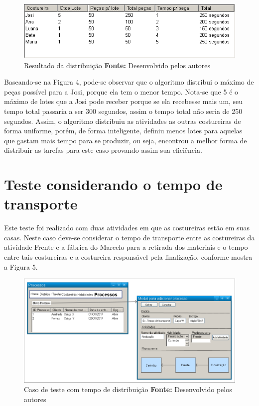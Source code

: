 \begin{figure}[h!]
	\centerline{\includegraphics[scale=0.6]{./imagens/test_case1_resultado.png}}
	\caption[Caso de teste Habilidade]
	{Resultado da distribuição \textbf{Fonte:} Desenvolvido pelos autores}
	\label{fig:exemplo1}
\end{figure}

\par Baseando-se na Figura 4, pode-se observar que o algoritmo distribui o
máximo de peças possível para a Josi, porque ela tem o menor tempo. Nota-se que 5 é o máximo de lotes que a Josi pode receber porque se ela recebesse mais um, seu 
tempo total passaria a ser 300 segundos, assim o tempo total não seria de 250
segundos. Assim, o algoritmo distribuiu as atividades as outras costureiras de forma uniforme, porém, de forma inteligente, definiu menos lotes para aquelas que 
gastam mais tempo para se produzir, ou seja, encontrou a melhor forma de distribuir as tarefas para este caso provando assim
sua eficiência.

\section{Teste considerando o tempo de transporte}
\par Este teste foi realizado com duas atividades em que as costureiras estão em suas casas. Neste caso deve-se considerar
o tempo de transporte entre as costureiras da atividade Frente e a fábrica do Marcelo para a retirada dos materiais e o tempo 
entre tais costureiras e a costureira responsável pela finalização, conforme
mostra a Figura 5.


\begin{figure}[h!]
	\centerline{\includegraphics[scale=0.3]{./imagens/test_case_2.png}}
	\caption[Caso de teste tempo]
	{Caso de teste com tempo de distribuição \textbf{Fonte:} Desenvolvido pelos autores}
	\label{fig:exemplo1}
\end{figure}


